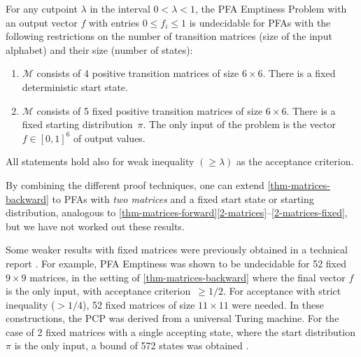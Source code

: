 \documentclass[a4paper,cleveref, autoref, thm-restate]{lipics-v2021}
\newif\ifanonymous
\newif\ifnotkurz
\newcommand\eeta{f} %
\begin{document}
\begin{theorem}
  \label{thm-matrices-backward}
For any cutpoint $\lambda$ in the interval $0<\lambda<1$,  
the PFA Emptiness Problem %
with an output vector $\eeta$ with entries $0\le\eeta_i\le1$
is undecidable for PFAs with
 the following restrictions on the number
 of transition matrices (size of the input alphabet)
 and their size (number of states):
  \begin{enumerate}[\rm(a)]
  \item \label{backward}
    $\mathcal{M}$ consists of
    4 %
    positive
 transition matrices of size $6\times 6$.
   There is a fixed deterministic start state.
  \item \label{backward-fixed}
    $\mathcal{M}$ consists of
    5 %
    fixed
 positive 
    transition matrices of size $6\times 6$.
   There is a fixed starting distribution~$\pi$.
    The only input of the problem
   is the vector $\eeta\in [0,1]^6$ of output values.
\end{enumerate}
All statements hold also for weak inequality $(\ge\lambda)$ as the  acceptance criterion.
\end{theorem}

By combining the different proof techniques, one can extend
\autoref{thm-matrices-backward} to PFAs with \emph{two matrices}
and a fixed start state or starting distribution,
analogous to
\autoref{thm-matrices-forward}\ref{2-matrices}--\ref{2-matrices-fixed}, but
we have not worked out these results.

%

\ifanonymous\else
Some weaker results with fixed matrices were previously obtained
in a technical report \cite[Theorems~2 and~4]{r-pfaeu-24}. %
For example, PFA Emptiness was shown to be undecidable for 52 fixed $9\times9$
matrices,
in the setting
of \autoref{thm-matrices-backward}
where the final vector $f$ is the only input,
with acceptance criterion~$\ge1/2$.
For acceptance with strict inequality ($>1/4$),
52 fixed
matrices of size  $11\times11$ were needed.
In these constructions, the PCP was derived from a universal Turing machine.
%
For the case of 2 fixed matrices with
a single accepting state, where the start distribution $\pi$ is the only  input, a bound of 572
states was obtained
\cite[Theorem~3]{r-pfaeu-24}. %

\fi

\ifnotkurz
\end{document}
